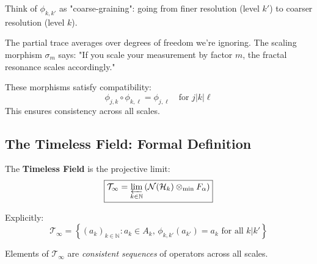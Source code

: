 \begin{intuitive}
Think of $\phi_{k,k'}$ as "coarse-graining": going from finer resolution (level $k'$) to coarser resolution (level $k$).

The partial trace averages over degrees of freedom we're ignoring. The scaling morphism $\sigma_m$ says: "If you scale your measurement by factor $m$, the fractal resonance scales accordingly."

These morphisms satisfy compatibility:
\begin{equation}
\phi_{j,k} \circ \phi_{k,\ell} = \phi_{j,\ell} \quad \text{for } j|k|\ell
\end{equation}
This ensures consistency across all scales.
\end{intuitive}

\subsection{The Timeless Field: Formal Definition}

\begin{defn}\label{def:timeless-field}
The \textbf{Timeless Field} is the projective limit:
\begin{equation}
\boxed{\mathcal{T}_\infty = \varprojlim_{k \in \mathbb{N}} \left(\mathcal{N}(\mathcal{H}_k) \otimes_{\min} F_\alpha\right)}
\end{equation}

Explicitly:
\begin{equation}
\mathcal{T}_\infty = \left\{(a_k)_{k \in \mathbb{N}} : a_k \in A_k, \, \phi_{k,k'}(a_{k'}) = a_k \text{ for all } k|k'\right\}
\end{equation}

Elements of $\mathcal{T}_\infty$ are \textit{consistent sequences} of operators across all scales.
\end{defn}


